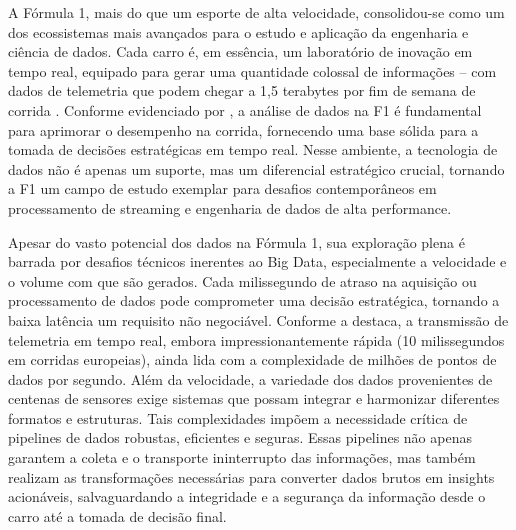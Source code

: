 \documentclass[12pt, %
openright, 
oneside, %
a4paper,    %
brazil]{facom-ufu-abntex2}
\begin{document}
A Fórmula 1, mais do que um esporte de alta velocidade, consolidou-se como um dos 
ecossistemas mais avançados para o estudo e aplicação da engenharia e ciência de dados. 
Cada carro é, em essência, um laboratório de inovação em tempo real, equipado para gerar 
uma quantidade colossal de informações – com dados de telemetria que podem chegar a 1,5 
terabytes por fim de semana de corrida \cite{Luzich}. Conforme evidenciado por 
, a análise de dados na F1 é fundamental para aprimorar o desempenho na corrida, 
fornecendo uma base sólida para a tomada de decisões estratégicas em tempo real. 
Nesse ambiente, a tecnologia de dados não é apenas um suporte, mas um diferencial estratégico crucial, 
tornando a F1 um campo de estudo exemplar para desafios contemporâneos em processamento de streaming e engenharia de 
dados de alta performance.

Apesar do vasto potencial dos dados na Fórmula 1, sua exploração plena é barrada por 
desafios técnicos inerentes ao Big Data, especialmente a velocidade e o volume com que 
são gerados. Cada milissegundo de atraso na aquisição ou processamento de dados pode 
comprometer uma decisão estratégica, tornando a baixa latência um requisito não 
negociável. Conforme a  destaca, a transmissão de 
telemetria em tempo real, embora impressionantemente rápida (10 milissegundos em 
corridas europeias), ainda lida com a complexidade de milhões de pontos de dados por 
segundo. Além da velocidade, a variedade dos dados provenientes de centenas de sensores 
exige sistemas que possam integrar e harmonizar diferentes formatos e estruturas. Tais 
complexidades impõem a necessidade crítica de pipelines de dados robustas, eficientes e 
seguras. Essas pipelines não apenas garantem a coleta e o transporte ininterrupto das 
informações, mas também realizam as transformações necessárias para converter dados 
brutos em insights acionáveis, salvaguardando a integridade e a segurança da informação 
desde o carro até a tomada de decisão final.
\end{document}
